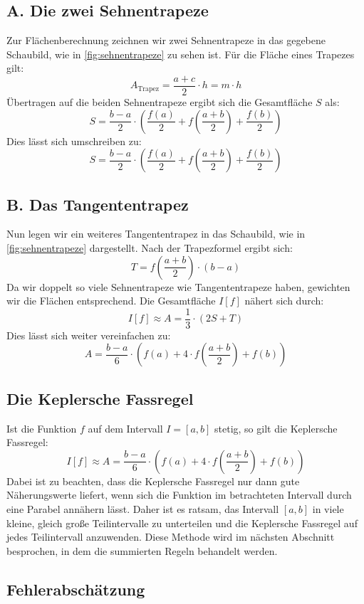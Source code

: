 \subsection*{A. Die zwei Sehnentrapeze}

Zur Flächenberechnung zeichnen wir zwei Sehnentrapeze in das gegebene Schaubild, wie in \autoref{fig:sehnentrapeze} zu sehen ist. Für die Fläche eines Trapezes gilt:
\[
A_{\text{Trapez}} = \frac{a + c}{2} \cdot h = m \cdot h
\]
Übertragen auf die beiden Sehnentrapeze ergibt sich die Gesamtfläche $S$ als:
\[
S = \frac{b - a}{2} \cdot \left(\frac{f(a)}{2} + f\left(\frac{a + b}{2}\right) + \frac{f(b)}{2}\right)
\]
Dies lässt sich umschreiben zu:
\[
S = \frac{b - a}{2} \cdot \left(\frac{f(a)}{2} + f\left(\frac{a + b}{2}\right) + \frac{f(b)}{2}\right)
\]

\subsection*{B. Das Tangententrapez}

Nun legen wir ein weiteres Tangententrapez in das Schaubild, wie in \autoref{fig:sehnentrapeze} dargestellt. Nach der Trapezformel ergibt sich:
\[
T = f\left(\frac{a + b}{2}\right) \cdot (b - a)
\]
Da wir doppelt so viele Sehnentrapeze wie Tangententrapeze haben, gewichten wir die Flächen entsprechend. Die Gesamtfläche $I[f]$ nähert sich durch:
\[
I[f] \approx A = \frac{1}{3} \cdot (2S + T)
\]
Dies lässt sich weiter vereinfachen zu:
\[
A = \frac{b - a}{6} \cdot \left(f(a) + 4 \cdot f\left(\frac{a + b}{2}\right) + f(b)\right)
\]

\subsection*{Die Keplersche Fassregel}

Ist die Funktion $f$ auf dem Intervall $I = [a, b]$ stetig, so gilt die Keplersche Fassregel:
\[
I[f] \approx A = \frac{b - a}{6} \cdot \left(f(a) + 4 \cdot f\left(\frac{a + b}{2}\right) + f(b)\right)
\]
Dabei ist zu beachten, dass die Keplersche Fassregel nur dann gute Näherungswerte liefert, wenn sich die Funktion im betrachteten Intervall durch eine Parabel annähern lässt. Daher ist es ratsam, das Intervall $[a, b]$ in viele kleine, gleich große Teilintervalle zu unterteilen und die Keplersche Fassregel auf jedes Teilintervall anzuwenden. Diese Methode wird im nächsten Abschnitt besprochen, in dem die summierten Regeln behandelt werden. \cite{skript}

\subsection{Fehlerabschätzung}
\label{sec:fehlerabschätzung}


